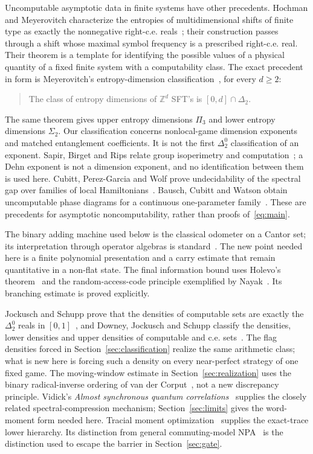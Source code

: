 Uncomputable asymptotic data in finite systems have other precedents. Hochman and Meyerovitch characterize the entropies of multidimensional shifts of finite type as exactly the nonnegative right-c.e. reals~\cite{HM10}; their construction passes through a shift whose maximal symbol frequency is a prescribed right-c.e. real. Their theorem is a template for identifying the possible values of a physical quantity of a fixed finite system with a computability class. The exact precedent in form is Meyerovitch's entropy-dimension classification~\cite[Theorem~5.1(3), arXiv version]{Mey11}, for every $d\ge2$:
\begin{quote}
The class of entropy dimensions of $\mathbb Z^d$ SFT's is $[0,d]\cap\Delta_2$.
\end{quote}
The same theorem gives upper entropy dimensions $\Pi_3$ and lower entropy dimensions $\Sigma_2$. Our classification concerns nonlocal-game dimension exponents and matched entanglement coefficients. It is not the first $\Delta^0_2$ classification of an exponent. Sapir, Birget and Rips relate group isoperimetry and computation~\cite{SBR02}; a Dehn exponent is not a dimension exponent, and no identification between them is used here. Cubitt, Perez-Garcia and Wolf prove undecidability of the spectral gap over families of local Hamiltonians~\cite{CPGW22}. Bausch, Cubitt and Watson obtain uncomputable phase diagrams for a continuous one-parameter family~\cite{BCW21}. These are precedents for asymptotic noncomputability, rather than proofs of~\eqref{eq:main}.

The binary adding machine used below is the classical odometer on a Cantor set; its interpretation through operator algebras is standard~\cite{HSWZ13}. The new point needed here is a finite polynomial presentation and a carry estimate that remain quantitative in a non-flat state. The final information bound uses Holevo's theorem~\cite{Hol73} and the random-access-code principle exemplified by Nayak~\cite{Nay99}. Its branching estimate is proved explicitly.


Jockusch and Schupp prove that the densities of computable sets are exactly the $\Delta^0_2$ reals in $[0,1]$~\cite[Theorem~2.21]{JS12}, and Downey, Jockusch and Schupp classify the densities, lower densities and upper densities of computable and c.e. sets~\cite[Section~5]{DJS13}. The flag densities forced in Section~\ref{sec:classification} realize the same arithmetic class; what is new here is forcing such a density on every near-perfect strategy of one fixed game. The moving-window estimate in Section~\ref{sec:realization} uses the binary radical-inverse ordering of van der Corput~\cite{vdC35}, not a new discrepancy principle. Vidick's \emph{Almost synchronous quantum correlations}~\cite{Vid22} supplies the closely related spectral-compression mechanism; Section~\ref{sec:limits} gives the word-moment form needed here. Tracial moment optimization~\cite{BK12,KMV22} supplies the exact-trace lower hierarchy. Its distinction from general commuting-model NPA~\cite{NPA08} is the distinction used to escape the barrier in Section~\ref{sec:gate}.

